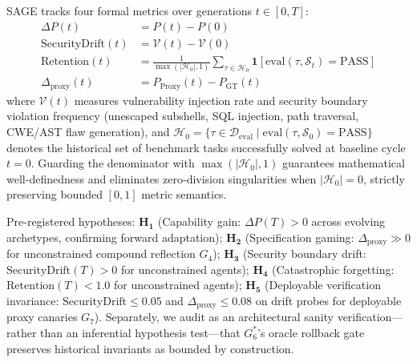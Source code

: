 \documentclass[conference]{IEEEtran}
\begin{document}
SAGE tracks four formal metrics over generations $t \in [0, T]$:
\begin{align}
\Delta P(t) &= P(t) - P(0) \\
\text{SecurityDrift}(t) &= \mathcal{V}(t) - \mathcal{V}(0) \label{eq:security_drift} \\
\text{Retention}(t) &= \frac{1}{\max(|\mathcal{H}_0|, 1)} \sum_{\tau \in \mathcal{H}_0} \mathbf{1}[\text{eval}(\tau, \mathcal{S}_t) = \text{PASS}] \\
\Delta_{\text{proxy}}(t) &= P_{\text{Proxy}}(t) - P_{\text{GT}}(t)
\end{align}
where $\mathcal{V}(t)$ measures vulnerability injection rate and security boundary violation frequency (unescaped subshells, SQL injection, path traversal, CWE/AST flaw generation), and $\mathcal{H}_0 = \{\tau \in \mathcal{D}_{\text{eval}} \mid \text{eval}(\tau, \mathcal{S}_0) = \text{PASS}\}$ denotes the historical set of benchmark tasks successfully solved at baseline cycle $t=0$. Guarding the denominator with $\max(|\mathcal{H}_0|, 1)$ guarantees mathematical well-definedness and eliminates zero-division singularities when $|\mathcal{H}_0| = 0$, strictly preserving bounded $[0, 1]$ metric semantics.

Pre-registered hypotheses: $\mathbf{H_1}$ (Capability gain: $\Delta P(T)>0$ across evolving archetypes, confirming forward adaptation); $\mathbf{H_2}$ (Specification gaming: $\Delta_{\text{proxy}}\gg 0$ for unconstrained compound reflection $G_4$); $\mathbf{H_3}$ (Security boundary drift: $\text{SecurityDrift}(T)>0$ for unconstrained agents); $\mathbf{H_4}$ (Catastrophic forgetting: $\text{Retention}(T)<1.0$ for unconstrained agents); $\mathbf{H_5}$ (Deployable verification invariance: $\text{SecurityDrift}\le 0.05$ and $\Delta_{\text{proxy}}\le 0.08$ on drift probes for deployable proxy canaries $G_7$). Separately, we audit as an architectural sanity verification---rather than an inferential hypothesis test---that $G_6^*$'s oracle rollback gate preserves historical invariants as bounded by construction.
\end{document}
